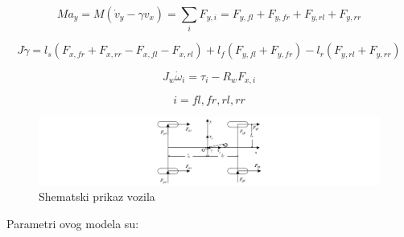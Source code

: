 \begin{equation}\label{eq:model-Y}
M a_y = M ( \dot{v}_y - \gamma v_x ) = \sum_i F_{y,i} = F_{y,fl}+F_{y,fr}+F_{y,rl}+F_{y,rr}
\end{equation}

\begin{equation}\label{eq:model-rot}
J \dot{\gamma} = l_s (F_{x,fr}+F_{x,rr}-F_{x,fl}-F_{x,rl}) + l_f (F_{y,fl}+F_{y,fr}) - l_r (F_{y,rl}+F_{y,rr})
\end{equation}

\begin{equation}\label{eq:model-wheel}
J_w \dot{\omega}_i = \tau_i - R_w F_{x,i}
\end{equation}

\begin{equation*}
i = fl, fr, rl, rr
\end{equation*}

\begin{figure}
\centering
\includegraphics[width=\textwidth]{slike/model/model.jpg}
\caption{Shematski prikaz vozila \citep{tian2018differential}}
\label{model:model}
\end{figure}

Parametri ovog modela su:

